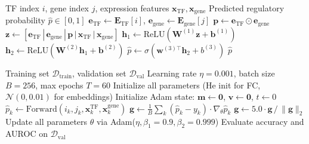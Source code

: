 \documentclass[journal]{IEEEtran}
\begin{document}
\begin{algorithm}[!t]
\caption{Cross-Encoder Forward Pass}
\label{alg:cross_encoder}
\begin{algorithmic}[1]
\REQUIRE TF index $i$, gene index $j$, expression features $\mathbf{x}_{\text{TF}}, \mathbf{x}_{\text{gene}}$
\ENSURE Predicted regulatory probability $\hat{p} \in [0, 1]$
\STATE $\mathbf{e}_{\text{TF}} \leftarrow \mathbf{E}_{\text{TF}}[i]$, \quad $\mathbf{e}_{\text{gene}} \leftarrow \mathbf{E}_{\text{gene}}[j]$
\STATE $\mathbf{p} \leftarrow \mathbf{e}_{\text{TF}} \odot \mathbf{e}_{\text{gene}}$ 
\STATE $\mathbf{z} \leftarrow [\mathbf{e}_{\text{TF}} \,|\, \mathbf{e}_{\text{gene}} \,|\, \mathbf{p} \,|\, \mathbf{x}_{\text{TF}} \,|\, \mathbf{x}_{\text{gene}}]$ 
\STATE $\mathbf{h}_1 \leftarrow \text{ReLU}(\mathbf{W}^{(1)} \mathbf{z} + \mathbf{b}^{(1)})$ 
\STATE $\mathbf{h}_2 \leftarrow \text{ReLU}(\mathbf{W}^{(2)} \mathbf{h}_1 + \mathbf{b}^{(2)})$ 
\STATE $\hat{p} \leftarrow \sigma(\mathbf{w}^{(3)\top} \mathbf{h}_2 + b^{(3)})$ 
\RETURN $\hat{p}$
\end{algorithmic}
\end{algorithm}

\begin{algorithm}[!t]
\caption{Training Loop (Both Architectures)}
\label{alg:training}
\begin{algorithmic}[1]
\REQUIRE Training set $\mathcal{D}_{\text{train}}$, validation set $\mathcal{D}_{\text{val}}$
\REQUIRE Learning rate $\eta = 0.001$, batch size $B = 256$, max epochs $T = 60$
\STATE Initialize all parameters (He init for FC, $\mathcal{N}(0, 0.01)$ for embeddings)
\STATE Initialize Adam state: $\mathbf{m} \leftarrow \mathbf{0}$, $\mathbf{v} \leftarrow \mathbf{0}$, $t \leftarrow 0$
    \STATE $\hat{p}_k \leftarrow \text{Forward}(i_k, j_k, \mathbf{x}^{\text{TF}}_k, \mathbf{x}^{\text{gene}}_k)$ 
    \STATE $\mathbf{g} \leftarrow \frac{1}{B} \sum_{k} (\hat{p}_k - y_k) \cdot \nabla_\theta \hat{p}_k$ 
      \STATE $\mathbf{g} \leftarrow 5.0 \cdot \mathbf{g} \,/\, \|\mathbf{g}\|_2$ 
    \ENDIF
    \STATE Update all parameters $\theta$ via Adam($\eta, \beta_1{=}0.9, \beta_2{=}0.999$)
  \ENDFOR
    \STATE Evaluate accuracy and AUROC on $\mathcal{D}_{\text{val}}$
  \ENDIF
\ENDFOR
\end{algorithmic}
\end{algorithm}
\end{document}
